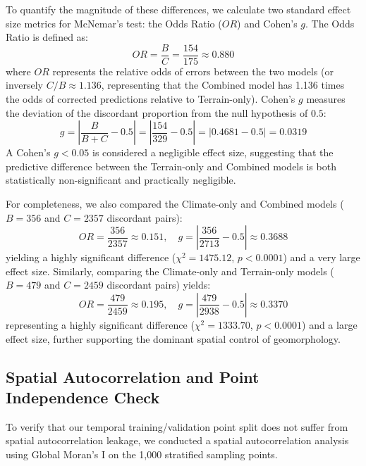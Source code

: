 To quantify the magnitude of these differences, we calculate two standard effect size metrics for McNemar's test: the Odds Ratio ($OR$) and Cohen's $g$. The Odds Ratio is defined as:
\begin{equation}
    OR = \frac{B}{C} = \frac{154}{175} \approx 0.880
\end{equation}
where $OR$ represents the relative odds of errors between the two models (or inversely $C/B \approx 1.136$, representing that the Combined model has 1.136 times the odds of corrected predictions relative to Terrain-only). Cohen's $g$ measures the deviation of the discordant proportion from the null hypothesis of $0.5$:
\begin{equation}
    g = \left| \frac{B}{B + C} - 0.5 \right| = \left| \frac{154}{329} - 0.5 \right| = |0.4681 - 0.5| = 0.0319
\end{equation}
A Cohen's $g < 0.05$ is considered a negligible effect size, suggesting that the predictive difference between the Terrain-only and Combined models is both statistically non-significant and practically negligible.

For completeness, we also compared the Climate-only and Combined models ($B=356$ and $C=2357$ discordant pairs):
\begin{equation}
    OR = \frac{356}{2357} \approx 0.151, \quad g = \left| \frac{356}{2713} - 0.5 \right| \approx 0.3688
\end{equation}
yielding a highly significant difference ($\chi^2 = 1475.12$, $p < 0.0001$) and a very large effect size. Similarly, comparing the Climate-only and Terrain-only models ($B=479$ and $C=2459$ discordant pairs) yields:
\begin{equation}
    OR = \frac{479}{2459} \approx 0.195, \quad g = \left| \frac{479}{2938} - 0.5 \right| \approx 0.3370
\end{equation}
representing a highly significant difference ($\chi^2 = 1333.70$, $p < 0.0001$) and a large effect size, further supporting the dominant spatial control of geomorphology.


\subsection*{Spatial Autocorrelation and Point Independence Check}
To verify that our temporal training/validation point split does not suffer from spatial autocorrelation leakage, we conducted a spatial autocorrelation analysis using Global Moran's I on the 1,000 stratified sampling points. 

